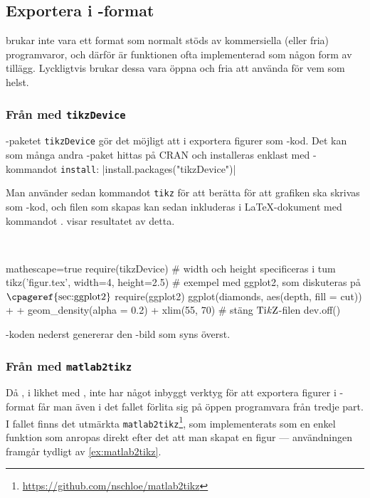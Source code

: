 \documentclass[10pt,../../a4.tex]{subfiles}
\begin{document}
\subsection{Exportera i \texorpdfstring{\PGFTikZ}{PGF/TikZ}-format}
\PGFTikZ brukar inte vara ett format som normalt stöds av kommersiella
(eller fria) programvaror, och därför är funktionen ofta implementerad
som någon form av tillägg. Lyckligtvis brukar dessa vara öppna och fria
att använda för vem som helst.

\subsubsection{Från \texorpdfstring{\Rlogo}{R} med \texttt{tikzDevice}}
\Rlogo-paketet \texttt{tikzDevice} \parencite{Sharpsteen12} gör det möjligt
att i \Rlogo exportera figurer som \PGFTikZ-kod. Det kan som många andra
\Rlogo-paket hittas på CRAN och installeras enklast med \Rlogo-kommandot \texttt{install}:
\splus|install.packages("tikzDevice")|

Man använder
sedan kommandot \texttt{tikz} för att berätta för \Rlogo att grafiken
ska skrivas som \PGFTikZ-kod, och filen som skapas kan sedan inkluderas
i \LaTeX-dokument med kommandot .
 visar resultatet av detta.

\begin{kod}[tbp]
	\centering
	\begin{minipage}{\textwidth}
		\centering
		
	\end{minipage}
	\\[1ex]
	\begin{minipage}{\textwidth}
		\begin{rcode*}{mathescape=true}
require(tikzDevice)
# width och height specificeras i tum
tikz('figur.tex', width=4, height=2.5)
# exempel med ggplot2, som diskuteras på $\text{\cpageref{sec:ggplot2}}$
require(ggplot2)
ggplot(diamonds, aes(depth, fill = cut)) +
  + geom_density(alpha = 0.2) + xlim(55, 70)
# stäng $\text{Ti\textit{k}Z}$-filen
dev.off()
		\end{rcode*}
	\end{minipage}
	\caption{\Rlogo-koden nederst genererar den \PGFTikZ-bild som
	syns överst.}
	\label{ex:tikzdevice}
\end{kod}

\subsubsection{Från \MATLAB med \texttt{matlab2tikz}}
\label{sec:matlab2tikz}
Då \MATLAB, i likhet med \Rlogo, inte har något inbyggt verktyg för att
exportera figurer i \PGFTikZ-format får man även i det fallet förlita sig
på öppen programvara från tredje part. I fallet \MATLAB finns det utmärkta
\texttt{matlab2tikz}\footnote{\url{https://github.com/nschloe/matlab2tikz}},
som implementerats som en enkel funktion som anropas direkt efter det
att man skapat en figur — användningen framgår tydligt av \cref{ex:matlab2tikz}.
\end{document}
